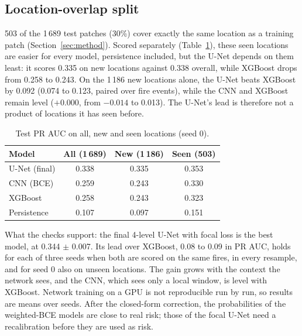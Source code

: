 \subsection{Location-overlap split}

503 of the 1\,689 test patches (30\%) cover exactly the same location as a training patch
(Section~\ref{sec:method}). Scored separately (Table~\ref{tab:dl_overlap}), these seen locations are easier
for every model, persistence included, but the U-Net depends on them least: it scores 0.335 on new
locations against 0.338 overall, while XGBoost drops from 0.258 to 0.243. On the 1\,186 new locations
alone, the U-Net beats XGBoost by 0.092 (0.074 to 0.123, paired over fire events), while the CNN and XGBoost
remain level ($+0.000$, from $-0.014$ to 0.013). The U-Net's lead is therefore not a product of locations it
has seen before.

\begin{table}[t]
\centering
\caption{Test PR AUC on all, new and seen locations (seed 0).}
\label{tab:dl_overlap}
\small
\renewcommand{\arraystretch}{1.12}
\begin{tabular}{lccc}
\toprule
\rowcolor{tblhead}
\textbf{Model} & \textbf{All (1\,689)} & \textbf{New (1\,186)} & \textbf{Seen (503)} \\
\midrule
\rowcolor{tblours}
U-Net (final) & 0.338 & 0.335 & 0.353 \\
CNN (BCE) & 0.259 & 0.243 & 0.330 \\
XGBoost & 0.258 & 0.243 & 0.323 \\
Persistence & 0.107 & 0.097 & 0.151 \\
\bottomrule
\end{tabular}
\end{table}

\begin{projectbox}
What the checks support: the final 4-level U-Net with focal loss is the best model, at 0.344 $\pm$ 0.007.
Its lead over XGBoost, 0.08 to 0.09 in PR AUC, holds for each of three seeds when both are scored on the same
fires, in every resample, and for seed 0 also on unseen locations. The gain grows with the context the
network sees, and the CNN, which sees only a local window, is level with XGBoost. Network training on a GPU
is not reproducible run by run, so results are means over seeds. After the closed-form correction, the
probabilities of the weighted-BCE models are close to real risk; those of the focal U-Net need a
recalibration before they are used as risk.
\end{projectbox}
